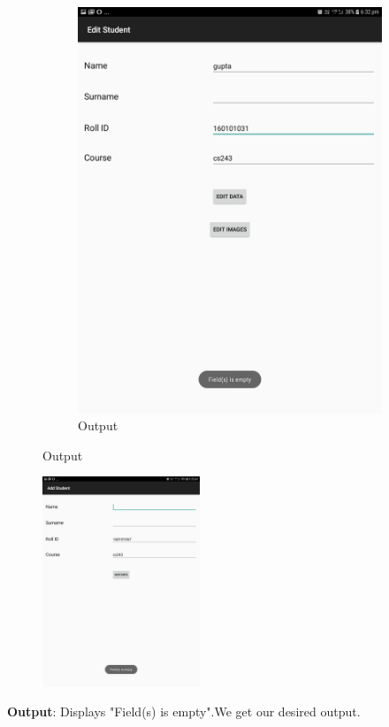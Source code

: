 \documentclass{scrreprt}
\begin{document}
\begin{itemize}
\begin{enumerate}
\begin{figure}[H]
\begin{subfigure}{0.5\textwidth}
\includegraphics[width=0.85\linewidth, keepaspectratio]{editempty2.jpg}
\caption{Output}
\label{fig:subim2}
\end{subfigure}
\end{figure}
\begin{figure}[H]
\centering
\includegraphics[width=0.42\textwidth, keepaspectratio]{addempty3.jpg}
\end{figure}
\textbf{Output}: Displays "Field(s) is empty".We get our desired output.


\end{enumerate}
\end{itemize}
\end{document}
